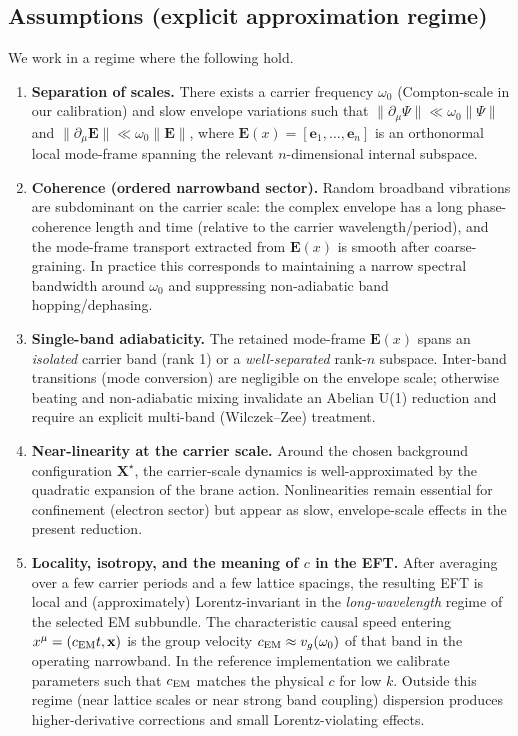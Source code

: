 \documentclass[11pt,a4paper]{article}
\newcommand{\X}{\mathbf{X}}                 %
\newcommand{\x}{\mathbf{x}}                 %
\begin{document}
\subsection{Assumptions (explicit approximation regime)}
We work in a regime where the following hold.
\begin{enumerate}
  \item \textbf{Separation of scales.} There exists a carrier frequency \(\omega_0\) (Compton-scale in our calibration)
        and slow envelope variations such that \(\|\partial_\mu \Psi\|\ll \omega_0\|\Psi\|\) and
        \(\|\partial_\mu \mathbf{E}\|\ll \omega_0\|\mathbf{E}\|\), where \(\mathbf{E}(x)=[\mathbf{e}_1,\dots,\mathbf{e}_n]\)
        is an orthonormal local mode-frame spanning the relevant \(n\)-dimensional internal subspace.

  \item \textbf{Coherence (ordered narrowband sector).} Random broadband vibrations are subdominant on the carrier scale:
        the complex envelope has a long phase-coherence length and time (relative to the carrier wavelength/period), and the
        mode-frame transport extracted from $\mathbf{E}(x)$ is smooth after coarse-graining. In practice this corresponds to
        maintaining a narrow spectral bandwidth around $\omega_0$ and suppressing non-adiabatic band hopping/dephasing.
  \item \textbf{Single-band adiabaticity.} The retained mode-frame $\mathbf{E}(x)$ spans an \emph{isolated} carrier band (rank 1) or a \emph{well-separated} rank-$n$ subspace.
        Inter-band transitions (mode conversion) are negligible on the envelope scale; otherwise beating and non-adiabatic mixing invalidate an Abelian U(1) reduction and require an explicit multi-band (Wilczek--Zee) treatment.
  \item \textbf{Near-linearity at the carrier scale.} Around the chosen background configuration \(\X^\star\),
        the carrier-scale dynamics is well-approximated by the quadratic expansion of the brane action.
        Nonlinearities remain essential for confinement (electron sector) but appear as slow, envelope-scale effects
        in the present reduction.
  \item \textbf{Locality, isotropy, and the meaning of \(c\) in the EFT.}
        After averaging over a few carrier periods and a few lattice spacings, the resulting EFT is local and
        (approximately) Lorentz-invariant in the \emph{long-wavelength} regime of the selected EM subbundle.
        The characteristic causal speed entering \(x^\mu=(c_{\rm EM}t,\x)\) is the group velocity
        \(c_{\rm EM}\approx v_g(\omega_0)\) of that band in the operating narrowband.
        In the reference implementation we calibrate parameters such that \(c_{\rm EM}\) matches the physical \(c\)
        for low \(k\). Outside this regime (near lattice scales or near strong band coupling) dispersion produces
        higher-derivative corrections and small Lorentz-violating effects.


\end{enumerate}
\end{document}
